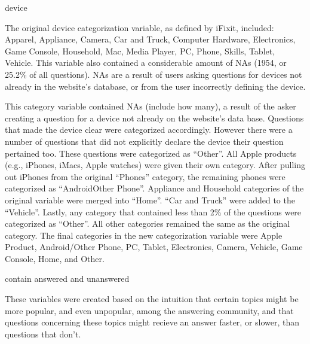 \documentclass[12pt]{article}
\begin{document}
device

The original device categorization variable, as defined by iFixit, included: Apparel, Appliance, Camera, Car and Truck, Computer Hardware, Electronics, Game Console, Household, Mac, Media Player, PC, Phone, Skills, Tablet, Vehicle. This variable also contained a considerable amount of NAs (1954, or 25.2\% of all questions). NAs are a result of users asking questions for devices not already in the website's database, or from the user incorrectly defining the device. 


This category variable contained NAs (include how many), a result of the asker creating a question for a device not already on the website's data base. Questions that made the device clear were categorized accordingly. However there were a number of questions that did not explicitly declare the device their question pertained too. These questions were categorized as ``Other''. All Apple products (e.g., iPhones, iMacs, Apple watches) were given their own category. After pulling out iPhones from the original ``Phones'' category, the remaining phones were categorized as ``AndroidOther Phone''. Appliance and Household categories of the original variable were merged into ``Home''. ``Car and Truck'' were added to the ``Vehicle''. Lastly, any category that contained less than 2\% of the questions were categorized as ``Other''. All other categories remained the same as the original category. The final categories in the new categorization variable were Apple Product, Android/Other Phone, PC, Tablet, Electronics, Camera, Vehicle, Game Console, Home, and Other. 

contain answered and unanswered

  These variables were created based on the intuition that certain topics might be more popular, and even unpopular, among the answering community, and that questions concerning these topics might recieve an answer faster, or slower, than questions that don't. 
  
\end{document}
